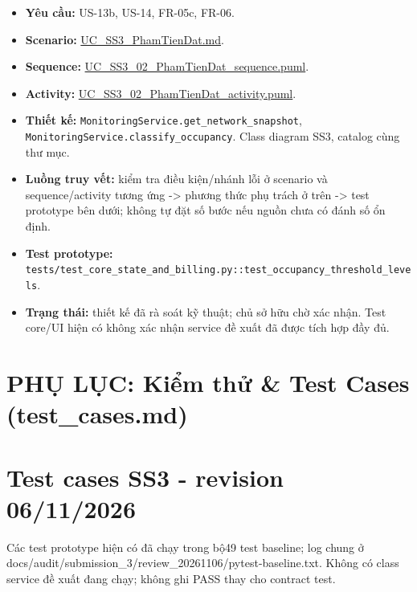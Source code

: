 \documentclass[11pt,a4paper]{article}
\providecommand{\tightlist}{%
  \setlength{\itemsep}{0pt}\setlength{\parskip}{0pt}}
\begin{document}
\begin{itemize}
\tightlist
\item
  \textbf{Yêu cầu:} US-13b, US-14, FR-05c, FR-06.
\item
  \textbf{Scenario:}
  \href{../../../../docs/diagrams/Use-case\%20detail-scenario/SS3/Usecase\%20scenario/UC_SS3_PhamTienDat.md}{UC\_SS3\_PhamTienDat.md}.
\item
  \textbf{Sequence:}
  \href{../../../../docs/diagrams/Use-case\%20detail-scenario/SS3/Sequence\%20diagrams/UC_SS3_02_PhamTienDat_sequence.puml}{UC\_SS3\_02\_PhamTienDat\_sequence.puml}.
\item
  \textbf{Activity:}
  \href{../../../../docs/diagrams/Use-case\%20detail-scenario/SS3/Activity\%20diagrams/UC_SS3_02_PhamTienDat_activity.puml}{UC\_SS3\_02\_PhamTienDat\_activity.puml}.
\item
  \textbf{Thiết kế:} \texttt{MonitoringService.get\_network\_snapshot},
  \texttt{MonitoringService.classify\_occupancy}. Class diagram SS3,
  catalog cùng thư mục.
\item
  \textbf{Luồng truy vết:} kiểm tra điều kiện/nhánh lỗi ở scenario và
  sequence/activity tương ứng -\textgreater{} phương thức phụ trách ở
  trên -\textgreater{} test prototype bên dưới; không tự đặt số bước nếu
  nguồn chưa có đánh số ổn định.
\item
  \textbf{Test prototype:}
  \texttt{tests/test\_core\_state\_and\_billing.py::test\_occupancy\_threshold\_levels}.
\item
  \textbf{Trạng thái:} thiết kế đã rà soát kỹ thuật; chủ sở hữu chờ xác
  nhận. Test core/UI hiện có không xác nhận service đề xuất đã được tích
  hợp đầy đủ.
\end{itemize}

\newpage
\section*{PHỤ LỤC: Kiểm thử \& Test Cases (test\_cases.md)}
\hypertarget{test-cases-ss3---revision-06112026}{%
\section{Test cases SS3 - revision
06/11/2026}\label{test-cases-ss3---revision-06112026}}

Các test prototype hiện có đã chạy trong bộ49 test baseline; log chung ở
docs/audit/submission\_3/review\_20261106/pytest-baseline.txt. Không có
class service đề xuất đang chạy; không ghi PASS thay cho contract test.
\end{document}
